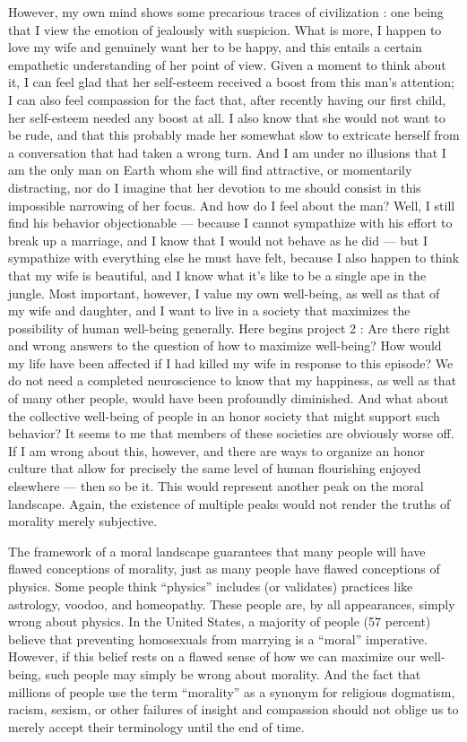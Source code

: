 \documentclass[a4paper,14pt]{extarticle}
\begin{document}
However, my own mind shows some precarious traces of civilization :
one being that I view the emotion of jealously with suspicion.
What is more, I happen to love my wife and genuinely want her to be happy, and this entails a certain empathetic understanding of her point of view.
Given a moment to think about it, I can feel glad that her self-esteem received a boost from this man's attention;
I can also feel compassion for the fact that, after recently having our first child, her self-esteem needed any boost at all.
I also know that she would not want to be rude, and that this probably made her somewhat slow to extricate herself from a conversation that had taken a wrong turn.
And I am under no illusions that I am the only man on Earth whom she will find attractive, or momentarily distracting, nor do I imagine that her devotion to me should consist in this impossible narrowing of her focus.
And how do I feel about the man?
Well, I still find his behavior objectionable --- because I cannot sympathize with his effort to break up a marriage, and I know that I would not behave as he did --- but I sympathize with everything else he must have felt, because I also happen to think that my wife is beautiful, and I know what it's like to be a single ape in the jungle.
Most important, however, I value my own well-being, as well as that of my wife and daughter, and I want to live in a society that maximizes the possibility of human well-being generally.
Here begins project 2 :
Are there right and wrong answers to the question of how to maximize well-being?
How would my life have been affected if I had killed my wife in response to this episode?
We do not need a completed neuroscience to know that my happiness, as well as that of many other people, would have been profoundly diminished.
And what about the collective well-being of people in an honor society that might support such behavior?
It seems to me that members of these societies are obviously worse off.
If I am wrong about this, however, and there are ways to organize an honor culture that allow for precisely the same level of human flourishing enjoyed elsewhere --- then so be it.
This would represent another peak on the moral landscape.
Again, the existence of multiple peaks would not render the truths of morality merely subjective.

The framework of a moral landscape guarantees that many people will have flawed conceptions of morality, just as many people have flawed conceptions of physics.
Some people think ``physics'' includes (or validates) practices like astrology, voodoo, and homeopathy.
These people are, by all appearances, simply wrong about physics.
In the United States, a majority of people (57 percent) believe that preventing homosexuals from marrying is a ``moral'' imperative.
However, if this belief rests on a flawed sense of how we can maximize our well-being, such people may simply be wrong about morality.
And the fact that millions of people use the term ``morality'' as a synonym for religious dogmatism, racism, sexism, or other failures of insight and compassion should not oblige us to merely accept their terminology until the end of time.
\end{document}
